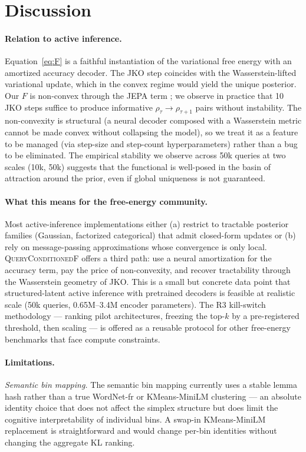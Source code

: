 \section{Discussion}
\label{sec:discussion}

\paragraph{Relation to active inference.}
Equation~\ref{eq:F} is a faithful instantiation of the variational
free energy with an amortized accuracy decoder. The JKO step
coincides with the Wasserstein-lifted variational update, which in
the convex regime would yield the unique posterior. Our $F$ is
non-convex through the JEPA term ; we observe in practice that 10
JKO steps suffice to produce informative $\rho_\tau \to \rho_{\tau+1}$
pairs without instability. The non-convexity is structural (a neural
decoder composed with a Wasserstein metric cannot be made convex
without collapsing the model), so we treat it as a feature to be
managed (via step-size and step-count hyperparameters) rather than a
bug to be eliminated. The empirical stability we observe across
50k queries at two scales (10k, 50k) suggests that the functional is
well-posed in the basin of attraction around the prior, even if
global uniqueness is not guaranteed.

\paragraph{What this means for the free-energy community.}
Most active-inference implementations either (a) restrict to
tractable posterior families (Gaussian, factorized categorical)
that admit closed-form updates or (b) rely on message-passing
approximations whose convergence is only local. \textsc{QueryConditionedF}
offers a third path: use a neural amortization for the accuracy term,
pay the price of non-convexity, and recover tractability through the
Wasserstein geometry of JKO. This is a small but concrete data point
that structured-latent active inference with pretrained decoders is
feasible at realistic scale (50k queries, 0.65M--3.4M encoder
parameters). The R3 kill-switch methodology --- ranking pilot
architectures, freezing the top-$k$ by a pre-registered threshold,
then scaling --- is offered as a reusable protocol for other
free-energy benchmarks that face compute constraints.

\paragraph{Limitations.}
\textit{Semantic bin mapping.}
The semantic bin mapping currently uses a stable lemma hash rather
than a true WordNet-fr or KMeans-MiniLM clustering --- an absolute
identity choice that does not affect the simplex structure but does
limit the cognitive interpretability of individual bins. A swap-in
KMeans-MiniLM replacement is straightforward and would change per-bin
identities without changing the aggregate KL ranking.

